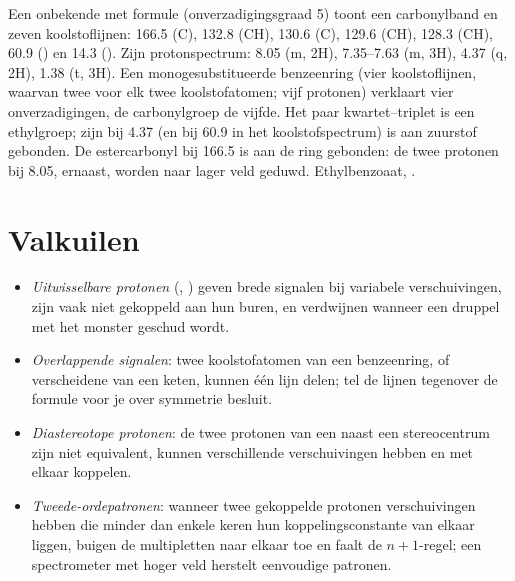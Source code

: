 \begin{example}\label{ex:b2:structure-determination:ester}
Een onbekende met formule  (onverzadigingsgraad 5) toont een carbonylband en zeven
koolstoflijnen: 166.5 (C), 132.8 (CH), 130.6 (C), 129.6 (CH), 128.3 (CH), 60.9 () en 14.3
(). Zijn protonspectrum: 8.05 (m, 2H), 7.35--7.63 (m, 3H), 4.37 (q, 2H), 1.38 (t, 3H). Een
monogesubstitueerde benzeenring (vier  koolstoflijnen, waarvan twee voor elk twee koolstofatomen; vijf
 protonen) verklaart vier onverzadigingen, de carbonylgroep de vijfde. Het paar kwartet--triplet
is een ethylgroep; zijn  bij 4.37 (en bij 60.9 in het koolstofspectrum) is aan zuurstof gebonden. De estercarbonyl
bij 166.5 is aan de ring gebonden: de twee protonen bij 8.05, ernaast, worden naar lager veld geduwd.
Ethylbenzoaat, .
\end{example}

\section{Valkuilen}

\begin{itemize}
  \item \emph{Uitwisselbare protonen} (, ) geven brede signalen bij variabele verschuivingen, zijn
        vaak niet gekoppeld aan hun buren, en verdwijnen wanneer een druppel  met het
        monster geschud wordt.
  \item \emph{Overlappende signalen}: twee koolstofatomen van een benzeenring, of verscheidene  van een keten, kunnen
        één lijn delen; tel de lijnen tegenover de formule voor je over symmetrie besluit.
  \item \emph{Diastereotope protonen}: de twee protonen van een  naast een stereocentrum zijn niet
        equivalent, kunnen verschillende verschuivingen hebben en met elkaar koppelen.
  \item \emph{Tweede-ordepatronen}: wanneer twee gekoppelde protonen verschuivingen hebben die minder dan enkele keren hun
        koppelingsconstante van elkaar liggen, buigen de multipletten naar elkaar toe en faalt de $n+1$-regel; een
        spectrometer met hoger veld herstelt eenvoudige patronen.
\end{itemize}

